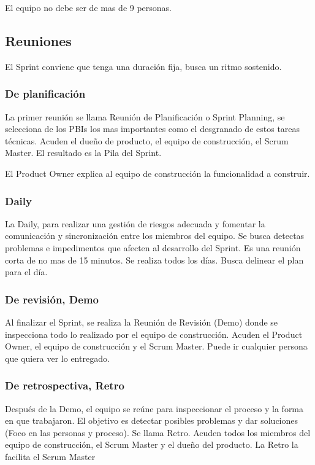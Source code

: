 \documentclass[titlepage,a4paper]{article}
\begin{document}
El equipo no debe ser de mas de 9 personas.

\subsection{Reuniones}
El Sprint conviene que tenga una duración fija, busca un ritmo sostenido.

\subsubsection*{De planificación}
La primer reunión se llama Reunión de Planificación o Sprint Planning, se selecciona de los PBIs los mas importantes como el desgranado de estos tareas técnicas. Acuden el dueño de producto, el equipo de construcción, el Scrum Master. El resultado es la Pila del Sprint.

El Product Owner explica al equipo de construcción la funcionalidad a construir.


\subsubsection*{Daily}
La Daily, para realizar una gestión de riesgos adecuada y fomentar la comunicación y sincronización entre los miembros del equipo. Se busca detectas problemas e impedimentos que afecten al desarrollo del Sprint. Es una reunión corta de no mas de 15 minutos. Se realiza todos los días. Busca delinear el plan para el día.

\subsubsection*{De revisión, Demo}
Al finalizar el Sprint, se realiza la Reunión de Revisión (Demo) donde se inspecciona todo lo realizado por el equipo de construcción. Acuden el Product Owner, el equipo de construcción y el Scrum Master. Puede ir cualquier persona que quiera ver lo entregado.

\subsubsection*{De retrospectiva, Retro}
Después de la Demo, el equipo se reúne para inspeccionar el proceso y la forma en que trabajaron. El objetivo es detectar posibles problemas y dar soluciones (Foco en las personas y proceso). Se llama Retro. Acuden todos los miembros del equipo de construcción, el Scrum Master y el dueño del producto. La Retro la facilita el Scrum Master
\end{document}
